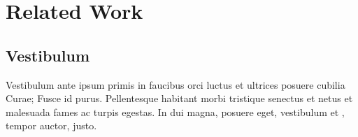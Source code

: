 \section{Related Work}

\subsection{Vestibulum}

Vestibulum ante ipsum primis in faucibus orci luctus et ultrices posuere cubilia Curae; Fusce id purus. Pellentesque habitant morbi tristique senectus et netus et malesuada fames ac turpis egestas. In dui magna, posuere eget, vestibulum et \cite{web:OpenCV}, tempor auctor, justo.

